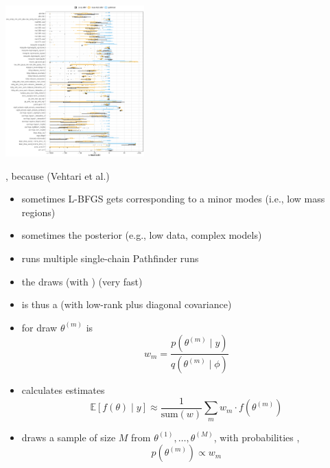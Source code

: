 \documentclass[9pt]{report}
\begin{document}
\vspace*{-10pt}
\begin{center}
  \includegraphics[width=0.4\textwidth]{img/elbo-eval.eps}
\end{center}
\vspace*{-6pt}
\begin{subitemize}
\item {}, because  \hfill (Vehtari et al.)
\end{subitemize}


\begin{itemize}
\item sometimes L-BFGS gets  corresponding to a minor modes (i.e., low mass regions)
\item sometimes the posterior  (e.g., low data, complex models)
\item {} runs multiple single-chain Pathfinder runs 
\item {} the draws (with ) (very fast)
\item {} is thus a  (with low-rank plus diagonal covariance)
\end{itemize}

\begin{itemize}
\item {} for draw $\theta^{(m)}$ is
  \[
    w_m = \frac{p(\theta^{(m)} \mid y)}
    {q(\theta^{(m)} \mid \phi)}
  \]
\item {} calculates estimates
  \[
    \mathbb{E}[f(\theta) \mid y]
    \approx \frac{1}{\textrm{sum}(w)} \sum_m w_m \cdot f(\theta^{(m)})
  \]
\item {} draws a sample of size $M$  from $\theta^{(1)}, \ldots, \theta^{(M)}$, with probabilities ,
\[
    p(\theta^{(m)}) \propto w_m
\]
\end{itemize}
\end{document}
